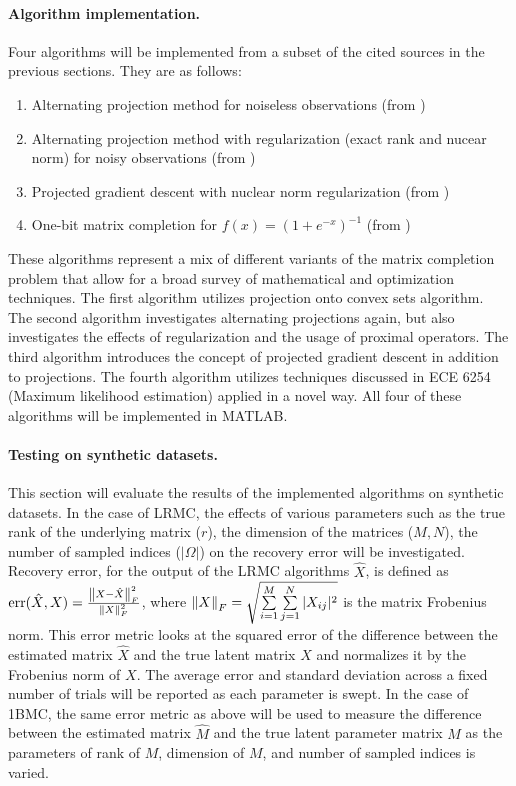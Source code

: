 \paragraph{\textbf{Algorithm implementation.}} Four algorithms will be implemented from a subset of the cited sources in the previous sections. They are as follows: 
\begin{enumerate}[(1)]
    \item Alternating projection method for noiseless observations (from \cite{fessler_2019})
    \item Alternating projection method with regularization (exact rank and nucear norm) for noisy observations (from \cite{fessler_2019})
    \item Projected gradient descent with nuclear norm regularization (from \cite{cai2010singular})
    \item One-bit matrix completion for $f(x) = (1 + e^{-x})^{-1}$ (from \cite{davenport20141})
\end{enumerate}
These algorithms represent a mix of different variants of the matrix completion problem that allow for a broad survey of mathematical and optimization techniques. The first algorithm utilizes projection onto convex sets algorithm. The second algorithm investigates alternating projections again, but also investigates the effects of regularization and the usage of proximal operators. The third algorithm introduces the concept of projected gradient descent in addition to projections. The fourth algorithm utilizes techniques discussed in ECE 6254 (Maximum likelihood estimation) applied in a novel way. All four of these algorithms will be implemented in MATLAB.

\paragraph{\textbf{Testing on synthetic datasets.}} This section will evaluate the results of the implemented algorithms on synthetic datasets. In the case of LRMC, the effects of various parameters such as the true rank of the underlying matrix ($r$), the dimension of the matrices ($M, N$), the number of sampled indices ($|\Omega|$) on the recovery error will be investigated. Recovery error, for the output of the LRMC algorithms $\hat{X}$, is defined as $\text{err}(\hat{X}, X) = \frac{\left\|X - \hat{X}\right\|_F^2}{\left\|X\right\|_F^2}$, where $\left\|X\right\|_F = \sqrt{\sum\limits_{i = 1}^M\sum\limits_{j = 1}^N |X_{ij}|^2}$ is the matrix Frobenius norm. This error metric looks at the squared error of the difference between the estimated matrix $\hat{X}$ and the true latent matrix $X$ and normalizes it by the Frobenius norm of $X$. The average error and standard deviation across a fixed number of trials will be reported as each parameter is swept. In the case of 1BMC, the same error metric as above will be used to measure the difference between the estimated matrix $\hat{M}$ and the true latent parameter matrix $M$ as the parameters of rank of $M$, dimension of $M$, and number of sampled indices is varied.
